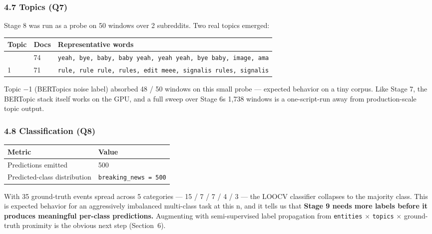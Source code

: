 \documentclass[
]{article}
\newcounter{none} %
\begin{document}
\subsubsection{4.7 Topics (Q7)}\label{47-topics-q7}

Stage 8 was run as a probe on 50 windows over 2 subreddits. Two real
topics emerged:

{\def\LTcaptype{none} %
\begin{longtable}[]{@{}lll@{}}
\toprule\noalign{}
Topic & Docs & Representative words \\
\midrule\noalign{}
\endhead
\bottomrule\noalign{}
\endlastfoot
0 & 74 &
\texttt{yeah,\ bye,\ baby,\ baby\ yeah,\ yeah\ yeah,\ bye\ baby,\ image,\ ama} \\
1 & 71 &
\texttt{rule,\ rule\ rule,\ rules,\ edit\ meee,\ signalis\ rules,\ signalis} \\
\end{longtable}
}

Topic $-$1 (BERTopic\textquotesingle s noise label) absorbed 48 / 50
windows on this small probe --- expected behavior on a tiny corpus. Like
Stage 7, the BERTopic stack itself works on the GPU, and a full sweep
over Stage 6\textquotesingle s 1,738 windows is a one-script-run away
from production-scale topic output.

\subsubsection{4.8 Classification (Q8)}\label{48-classification-q8}

{\def\LTcaptype{none} %
\begin{longtable}[]{@{}ll@{}}
\toprule\noalign{}
Metric & Value \\
\midrule\noalign{}
\endhead
\bottomrule\noalign{}
\endlastfoot
Predictions emitted & 500 \\
Predicted-class distribution & \texttt{breaking\_news\ =\ 500} \\
\end{longtable}
}

With 35 ground-truth events spread across 5 categories --- 15 / 7 / 7 /
4 / 3 --- the LOOCV classifier collapses to the majority class. This is
expected behavior for an aggressively imbalanced multi-class task at
this n, and it tells us that \textbf{Stage 9 needs more labels before it
produces meaningful per-class predictions.} Augmenting with
semi-supervised label propagation from \texttt{entities} $\times$
\texttt{topics} $\times$ ground-truth proximity is the obvious next step (Section~6).
\end{document}

